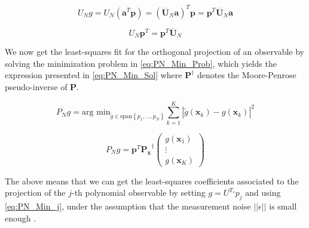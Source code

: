 \documentclass{article}
\begin{document}
        \begin{equation} \label{eq:Koopman_to_Matrix_1}
            U_N g = U_N \left(\mathbf{a}^T \mathbf{p}\right) = \left(\overline{\mathbf{U}}_N \mathbf{a}\right)^T \mathbf{p} = \mathbf{p}^T \overline{\mathbf{U}}_N \mathbf{a}
        \end{equation}

        \begin{equation} \label{eq:Koopman_to_Matrix_2}
            U_N \mathbf{p}^T = \mathbf{p}^T \overline{\mathbf{U}}_N
        \end{equation}

        We now get the least-squares fit for the orthogonal projection of an observable by solving the minimization problem in \cref{eq:PN_Min_Prob}, which yields the expression presented in \cref{eq:PN_Min_Sol} where $\mathbf{P}^\dagger$ denotes the Moore-Penrose pseudo-inverse of $\mathbf{P}$.

        \begin{equation} \label{eq:PN_Min_Prob}
            P_N g = \text{arg min}_{\tilde{g} \in \text{span}\left\{p_1 , \dots , p_N\right\}} \sum_{k=1}^K \left|\tilde{g}\left(\mathbf{x}_k\right) - g\left(\mathbf{x}_k\right)\right|^2
        \end{equation}

        \begin{equation} \label{eq:PN_Min_Sol}
            P_N g = \mathbf{p}^T \mathbf{P_x}^\dagger
                \begin{pmatrix}
                    g\left(\mathbf{x}_1\right) \\
                    \vdots \\
                    g\left(\mathbf{x}_K\right)
                \end{pmatrix}
        \end{equation}

        The above means that we can get the least-squares coefficients associated to the projection of the $j$-th polynomial observable by setting $g=U^{T_s} p_j$ and using \cref{eq:PN_Min_j}, under the assumption that the measurement noise $\left|\left|\epsilon\right|\right|$ is small enough \cite{Goncalves}.
\end{document}
